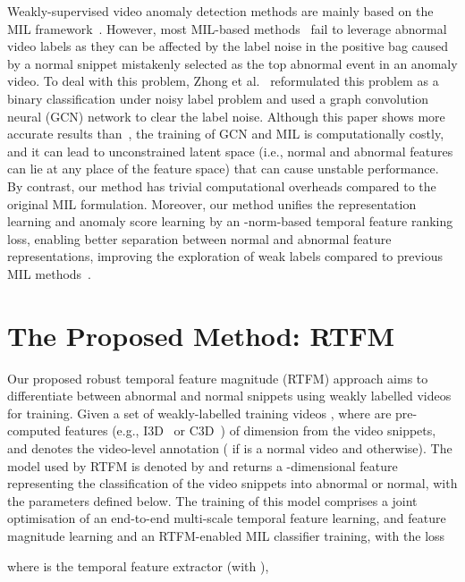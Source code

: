 \documentclass[10pt,twocolumn,letterpaper]{article}
\begin{document}
Weakly-supervised video anomaly detection methods are mainly based on the MIL framework~\cite{sultani2018real}. However, most MIL-based methods~\cite{sultani2018real,zhu2019motion,8803657} fail to leverage abnormal video labels as they can be affected by the label noise in the positive bag caused by a normal snippet mistakenly selected as the top abnormal event in an anomaly video. 
To deal with this problem, Zhong et al.~\cite{zhong2019graph} reformulated this problem as a binary classification under noisy label problem and used a graph convolution neural (GCN) network to clear the label noise. Although this paper shows more accurate results than~\cite{sultani2018real}, the training of GCN and MIL is computationally costly, and it can lead to unconstrained latent space (i.e., normal and abnormal features can lie at any place of the feature space) that can cause unstable performance. By contrast, our method has trivial computational overheads compared to the original MIL formulation. Moreover, our method unifies the representation learning and anomaly score learning by an -norm-based temporal feature ranking loss, enabling better separation between normal and abnormal feature representations, improving the exploration of weak labels compared to previous MIL methods~\cite{sultani2018real,8803657,9102722,Wu2020not,zhu2019motion,zhong2019graph}.

\section{The Proposed Method: RTFM}
\label{sec:architecture_overview}

Our proposed robust temporal feature magnitude (RTFM) approach aims to differentiate between abnormal and normal snippets using weakly labelled videos for training. 
Given a set of weakly-labelled training videos , where  
are pre-computed features (e.g., I3D~\cite{carreira2017quo} or C3D~\cite{tran2015learning}) of dimension  from the  video snippets, and  denotes the video-level annotation ( if  is a normal video and  otherwise).
The model used by RTFM is denoted by  and returns a -dimensional feature  representing the classification of the  video snippets into abnormal or normal, with the parameters  defined below.
The training of this model comprises a joint optimisation of an end-to-end multi-scale temporal feature learning, and feature magnitude learning and an RTFM-enabled MIL classifier training, with the loss

where 
 is the temporal feature extractor (with ), 
\end{document}
